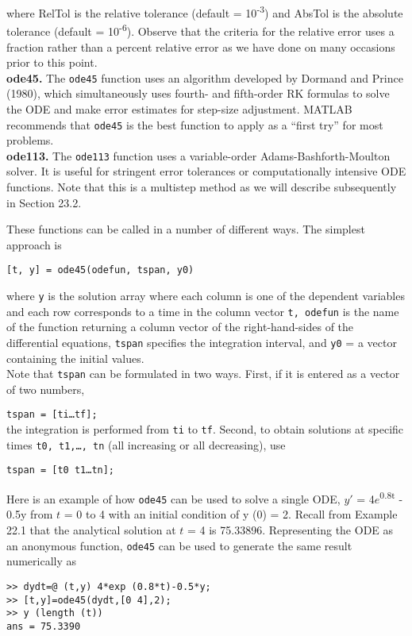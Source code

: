 \documentclass[../main.tex]{subfiles}
\begin{document}
where RelTol is the relative tolerance (default = 10\textsuperscript{-3}) and AbsTol is the absolute tolerance
(default = 10\textsuperscript{-6}). Observe that the criteria for the relative error uses a fraction rather than a
percent relative error as we have done on many occasions prior to this point.\\
\textbf{ode45.} The \texttt{ode45} function uses an algorithm developed by Dormand and Prince (1980),
which simultaneously uses fourth- and fifth-order RK formulas to solve the ODE and make
error estimates for step-size adjustment. MATLAB recommends that \texttt{ode45} is the best
function to apply as a ``first try'' for most problems.\\
\textbf{ode113.} The \texttt{ode113} function uses a variable-order Adams-Bashforth-Moulton solver. It
is useful for stringent error tolerances or computationally intensive ODE functions. Note
that this is a multistep method as we will describe subsequently in Section 23.2.

These functions can be called in a number of different ways. The simplest approach is
\begin{center}
    \texttt{[t, y] = ode45(odefun, tspan, y0)}
\end{center}
where \texttt{y} is the solution array where each column is one of the dependent variables and each
row corresponds to a time in the column vector \texttt{t, odefun} is the name of the function
returning a column vector of the right-hand-sides of the differential equations, \texttt{tspan} specifies the integration interval, and \texttt{y0} = a vector containing the initial values.\\
Note that \texttt{tspan} can be formulated in two ways. First, if it is entered as a vector of two numbers,

\texttt{tspan = [ti\ldots tf];}\\
the integration is performed from \texttt{ti} to \texttt{tf}. Second, to obtain solutions at specific times
\texttt{t0, t1,\ldots, tn} (all increasing or all decreasing), use

\texttt{tspan = [t0 t1\ldots tn];}

\noindent Here is an example of how \texttt{ode45} can be used to solve a single ODE, $y'$ =
4$e$\textsuperscript{0.8t} - 0.5y from $t$ = 0 to 4 with an initial condition of y (0) = 2. Recall from Example 22.1 that the analytical solution at $t$ = 4 is 75.33896. Representing the ODE as an
anonymous function, \texttt{ode45} can be used to generate the same result numerically as
\begin{lstlisting}
>> dydt=@ (t,y) 4*exp (0.8*t)-0.5*y;
>> [t,y]=ode45(dydt,[0 4],2);
>> y (length (t))
ans = 75.3390
\end{lstlisting}
\end{document}
